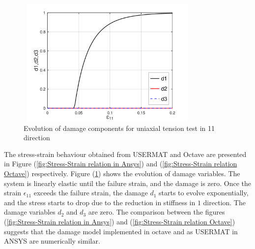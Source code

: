 \documentclass[12pt,a4paper,twoside,openright]{report}
\begin{document}
\FloatBarrier
\begin{figure}[hbt!]
\begin{center}
  \includegraphics[width=9cm,height=6.3cm]{21.d1,d2,d3.png}
   \caption{Evolution of damage components for uniaxial tension test in 11 direction}
   \label{fig:Evolution of damage in 11 direction} 
 \end{center}    
\end{figure}
\FloatBarrier
\indent\indent\indent The stress-strain behaviour obtained from USERMAT and Octave are presented in Figure (\ref{fig:Stress-Strain relation in Ansys}) and (\ref{fig:Stress-Strain relation Octave}) respectively.  Figure (\ref{fig:Evolution of damage in 11 direction}) shows the evolution of damage variables. The system is linearly elastic until the failure strain, and the damage is zero. Once the strain $\epsilon_{11}$ exceeds the failure strain, the damage $d_{1}$ starts to evolve exponentially, and the stress starts to drop due to the reduction in stiffness in $1$ direction.  The damage variables $d_{2}$ and $d_{3}$ are zero. The comparison between the figures (\ref{fig:Stress-Strain relation in Ansys}) and (\ref{fig:Stress-Strain relation Octave}) suggests that the damage model implemented in octave and as USERMAT in ANSYS are numerically similar.
\end{document}
